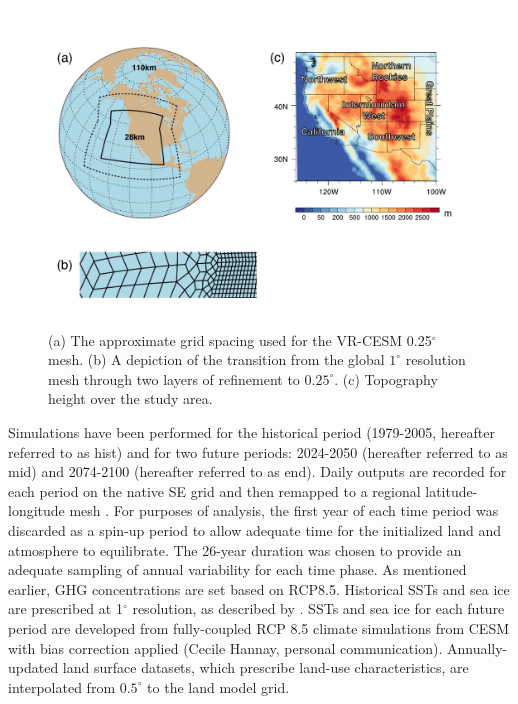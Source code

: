 \begin{figure}
\begin{center}
\includegraphics[width=5in]{gridmesh_mod.pdf}
\caption{(a) The approximate grid spacing used for the VR-CESM 0.25$^\circ$ mesh. (b) A depiction of the transition from the global $1^\circ$ resolution mesh through two layers of refinement to $0.25^\circ$. (c) Topography height over the study area.}
\label{fig:gridmesh}
\end{center}
\end{figure}

Simulations have been performed for the historical period (1979-2005, hereafter referred to as \textsf{hist}) and for two future periods: 2024-2050 (hereafter referred to as \textsf{mid}) and 2074-2100 (hereafter referred to as \textsf{end}).  Daily outputs are recorded for each period on the native SE grid and then remapped to a regional latitude-longitude mesh \cite{ullrich2015arbitrary,ullrich2016arbitrary}.  For purposes of analysis, the first year of each time period was discarded as a spin-up period to allow adequate time for the initialized land and atmosphere to equilibrate. The 26-year duration was chosen to provide an adequate sampling of annual variability for each time phase. As mentioned earlier, GHG concentrations are set based on RCP8.5. Historical SSTs and sea ice are prescribed at 1$^\circ$ resolution, as described by \cite{hurrell2008new}. SSTs and sea ice for each future period are developed from fully-coupled RCP 8.5 climate simulations from CESM with bias correction applied  (Cecile Hannay, personal communication).  Annually-updated land surface datasets, which prescribe land-use characteristics, are interpolated from $0.5^\circ$ to the land model grid.


